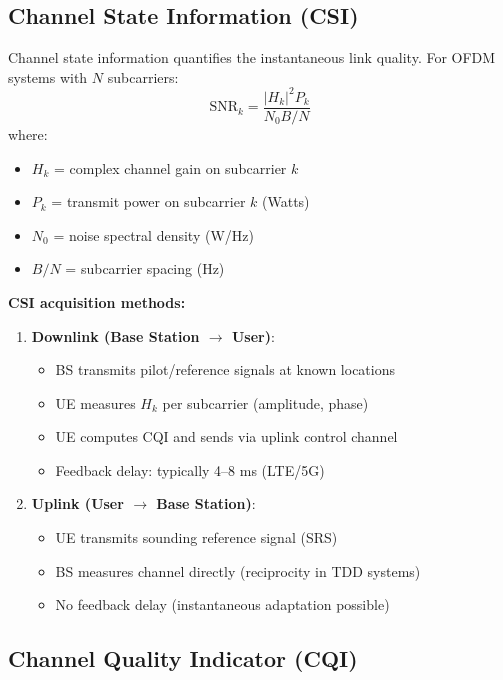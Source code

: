 \subsection{Channel State Information (CSI)}

Channel state information quantifies the instantaneous link quality. For OFDM systems with $N$ subcarriers:
\begin{equation}
\text{SNR}_k = \frac{|H_k|^2 P_k}{N_0 B/N}
\end{equation}
where:
\begin{itemize}
\item $H_k$ = complex channel gain on subcarrier $k$
\item $P_k$ = transmit power on subcarrier $k$ (Watts)
\item $N_0$ = noise spectral density (W/Hz)
\item $B/N$ = subcarrier spacing (Hz)
\end{itemize}

\textbf{CSI acquisition methods:}

\begin{enumerate}
\item \textbf{Downlink (Base Station $\rightarrow$ User)}:
  \begin{itemize}
  \item BS transmits pilot/reference signals at known locations
  \item UE measures $H_k$ per subcarrier (amplitude, phase)
  \item UE computes CQI and sends via uplink control channel
  \item Feedback delay: typically 4--8 ms (LTE/5G)
  \end{itemize}

\item \textbf{Uplink (User $\rightarrow$ Base Station)}:
  \begin{itemize}
  \item UE transmits sounding reference signal (SRS)
  \item BS measures channel directly (reciprocity in TDD systems)
  \item No feedback delay (instantaneous adaptation possible)
  \end{itemize}
\end{enumerate}

\subsection{Channel Quality Indicator (CQI)}

